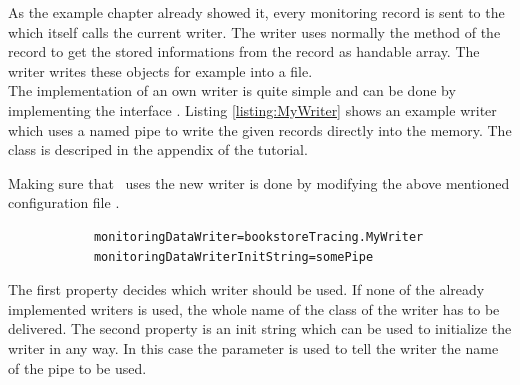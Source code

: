 		As the example chapter already showed it, every monitoring record is sent to the  which itself calls the current writer. The writer uses normally the  method of the record to get the stored informations from the record as handable array. The writer writes these objects for example into a file.\\
		The implementation of an own writer is quite simple and can be done by implementing the interface . Listing \ref{listing:MyWriter} shows an example writer which uses a named pipe to write the given records directly into the memory. The class  is descriped in the appendix of the tutorial. 

		\setJavaCodeListing
		

		Making sure that \Kieker\  uses the new writer is done by modifying the above mentioned configuration file \dir{\monitoringPropertiesFile}.

		\setBashListing       
		\begin{lstlisting}
			monitoringDataWriter=bookstoreTracing.MyWriter
			monitoringDataWriterInitString=somePipe
		\end{lstlisting}

		The first property decides which writer should be used. If none of the already implemented writers is used, the whole name of the class of the writer has to be delivered. The second property is an init string which can be used to initialize the writer in any way. In this case the parameter is used to tell the writer the name of the pipe to be used.\\
